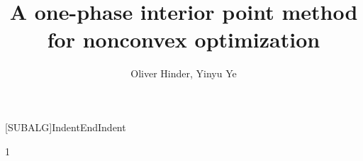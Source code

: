 \documentclass{article}
\begin{document}
\title{A one-phase interior point method for nonconvex optimization}
\author{Oliver Hinder, Yinyu Ye}

[SUBALG]{Indent}{EndIndent}{}{\algorithmicend\ }%

\maketitle


\def\inProgress{0}

\if\inProgress1
\newcommand{\inProgressHide}[1]{#1} %
\newcommand{\yinyu}[1]{{\color{red} Yinyu: #1}}
\newcommand{\hinder}[1]{{\color{red}{Hinder: #1}}}
\newcommand{\ron}[1]{ {\color{orange}Ron:  #1}}
\else
\newcommand{\inProgressHide}[1]{} %
\newcommand{\yinyu}[1]{}
\newcommand{\hinder}[1]{}
\newcommand{\ron}[1]{}
\fi

\newcommand{\fracBound}{fraction-to-boundary}
\newcommand{\kStart}{k_{\text{start}}}
\newcommand{\kEnd}{k_{\text{end}}}

\newcommand{\algorithmicbreak}{\textbf{break}}
\newcommand{\obj}{f}
\newcommand{\cons}{a}
\newcommand{\hess}{\grad^2}
\newcommand{\nvar}{n}
\newcommand{\ncon}{m}

\renewcommand{\vec}[1]{#1}

\newcommand{\eye}{I}
\newcommand{\ones}{\vec{e}}
\newcommand{\dir}[1]{\vec{d}_{\vec{#1}}}
\newcommand{\Dir}[1]{D_{\vec{#1}}}


\newcommand{\LDL}{LDL}
\newcommand{\LBL}{LBL}



\newcommand{\parNumCor}{j_{\max}}
\newcommand{\parNumCorValue}{2}




\newcommand{\parConRegularizer}{\beta_{1}}
\newcommand{\parConRegularizerValue}{10^{-4}}
\newcommand{\parConRegularizerInterval}{(0,1)}

\newcommand{\parComp}{\beta_{2}}
\newcommand{\parCompValue}{0.01}
\newcommand{\parCompInterval}{(0,1)}

\newcommand{\parCompAgg}{\beta_{3}}
\newcommand{\parCompAggValue}{0.02}
\newcommand{\parCompAggInterval}{(\parComp,1)}
\end{document}
